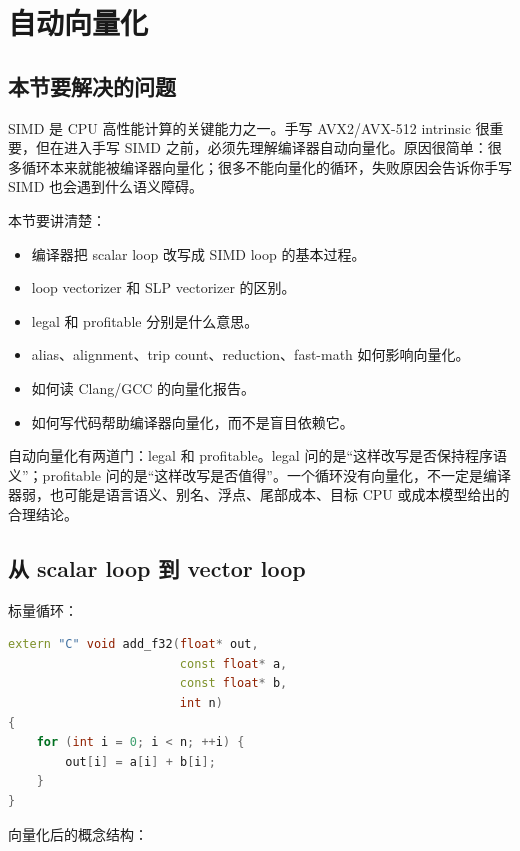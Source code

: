 \section{自动向量化}

\subsection{本节要解决的问题}

SIMD 是 CPU 高性能计算的关键能力之一。手写 AVX2/AVX-512 intrinsic 很重要，但在进入手写 SIMD 之前，必须先理解编译器自动向量化。原因很简单：很多循环本来就能被编译器向量化；很多不能向量化的循环，失败原因会告诉你手写 SIMD 也会遇到什么语义障碍。

本节要讲清楚：

\begin{itemize}
  \item 编译器把 scalar loop 改写成 SIMD loop 的基本过程。
  \item loop vectorizer 和 SLP vectorizer 的区别。
  \item legal 和 profitable 分别是什么意思。
  \item alias、alignment、trip count、reduction、fast-math 如何影响向量化。
  \item 如何读 Clang/GCC 的向量化报告。
  \item 如何写代码帮助编译器向量化，而不是盲目依赖它。
\end{itemize}

\begin{keyidea}
自动向量化有两道门：legal 和 profitable。legal 问的是“这样改写是否保持程序语义”；profitable 问的是“这样改写是否值得”。一个循环没有向量化，不一定是编译器弱，也可能是语言语义、别名、浮点、尾部成本、目标 CPU 或成本模型给出的合理结论。
\end{keyidea}

\subsection{从 scalar loop 到 vector loop}

标量循环：

\begin{lstlisting}[language=C++]
extern "C" void add_f32(float* out,
                        const float* a,
                        const float* b,
                        int n)
{
    for (int i = 0; i < n; ++i) {
        out[i] = a[i] + b[i];
    }
}
\end{lstlisting}

向量化后的概念结构：

